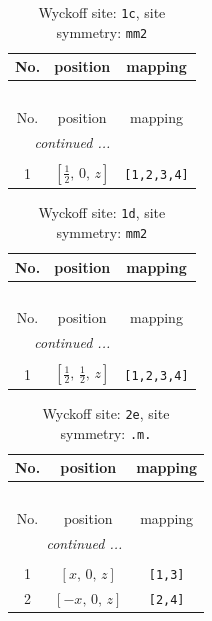 \documentclass[fleqn,8pt]{jsarticle}
\begin{document}
\begin{longtable}{ccc}
\caption{Wyckoff site: {\tt 1c}, site symmetry: {\tt mm2}}
 \\
 \hline \hline
No. & position & mapping \\ \hline \endfirsthead

\multicolumn{2}{l}{\tablename\ \thetable{}} \\
 \hline \hline
No. & position & mapping \\ \hline \endhead

 \hline \hline
\multicolumn{2}{r}{\footnotesize\it continued ...} \\ \endfoot

 \hline \hline
\multicolumn{2}{r}{} \\ \endlastfoot

1 & $\left[ \frac{1}{2},\, 0,\, z \right]$ & {\tt [1,2,3,4]} \\
\end{longtable}
\renewcommand{\arraystretch}{1.2}
\begin{longtable}{ccc}
\caption{Wyckoff site: {\tt 1d}, site symmetry: {\tt mm2}}
 \\
 \hline \hline
No. & position & mapping \\ \hline \endfirsthead

\multicolumn{2}{l}{\tablename\ \thetable{}} \\
 \hline \hline
No. & position & mapping \\ \hline \endhead

 \hline \hline
\multicolumn{2}{r}{\footnotesize\it continued ...} \\ \endfoot

 \hline \hline
\multicolumn{2}{r}{} \\ \endlastfoot

1 & $\left[ \frac{1}{2},\, \frac{1}{2},\, z \right]$ & {\tt [1,2,3,4]} \\
\end{longtable}
\renewcommand{\arraystretch}{1.2}
\begin{longtable}{ccc}
\caption{Wyckoff site: {\tt 2e}, site symmetry: {\tt .m.}}
 \\
 \hline \hline
No. & position & mapping \\ \hline \endfirsthead

\multicolumn{2}{l}{\tablename\ \thetable{}} \\
 \hline \hline
No. & position & mapping \\ \hline \endhead

 \hline \hline
\multicolumn{2}{r}{\footnotesize\it continued ...} \\ \endfoot

 \hline \hline
\multicolumn{2}{r}{} \\ \endlastfoot

1 & $\left[ x,\, 0,\, z \right]$ & {\tt [1,3]} \\ \hline
2 & $\left[ - x,\, 0,\, z \right]$ & {\tt [2,4]} \\
\end{longtable}
\end{document}
